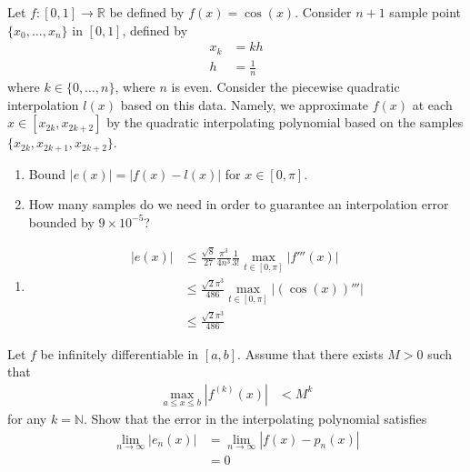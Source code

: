 \documentclass[fleqn, a4paper, 11pt, oneside]{amsart}
\theoremstyle{definition}
\theoremstyle{theorem}
\begin{document}
\begin{question}
	Let $f : [0,1] \to \mathbb{R}$ be defined by $f(x) = \cos(x)$.
	Consider $n + 1$ sample point $\{x_0,\dots,x_n\}$ in $[0,1]$, defined by
	\begin{align*}
		x_k & = k h \\
		h   & = \frac{1}{n}
	\end{align*}
	where $k \in \{0,\dots,n\}$, where $n$ is even.
	Consider the piecewise quadratic interpolation $l(x)$ based on this data.
	Namely, we approximate $f(x)$ at each $x \in [x_{2 k},x_{2 k + 2}]$ by the quadratic interpolating polynomial based on the samples $\{x_{2 k},x_{2 k + 1},x_{2 k + 2}\}$.
	\begin{enumerate}
		\item Bound $\left| e(x) \right| = \left| f(x) - l(x) \right|$ for $x \in [0,\pi]$.
		\item How many samples do we need in order to guarantee an interpolation error bounded by $9 \times 10^{-5}$?
	\end{enumerate}
\end{question}

\begin{solution}
	\begin{enumerate}[leftmargin=*]
		\item
			\begin{align*}
				\left| e(x) \right| & \le \frac{\sqrt{8}}{27} \frac{\pi^3}{4 n^3} \frac{1}{3!} \max\limits_{t \in [0,\pi]} \left| f'''(x) \right| \\
                                                    & \le \frac{\sqrt{2} \pi^3}{486} \max\limits_{t \in [0,\pi]} \left| \left( \cos(x) \right)''' \right|         \\
                                                    & \le \frac{\sqrt{2} \pi^3}{486}
			\end{align*}
	\end{enumerate}
\end{solution}

\begin{question}
	Let $f$ be infinitely differentiable in $[a,b]$.
	Assume that there exists $M > 0$ such that
	\begin{align*}
		\max\limits_{a \le x \le b} \left| f^{(k)}(x) \right| & < M^k
	\end{align*}
	for any $k = \mathbb{N}$.
	Show that the error in the interpolating polynomial satisfies
	\begin{align*}
		\lim\limits_{n \to \infty} \left| e_n(x) \right| & = \lim\limits_{n \to \infty} \left| f(x) - p_n(x) \right| \\
                                                                 & = 0
	\end{align*}
\end{question}
\end{document}
